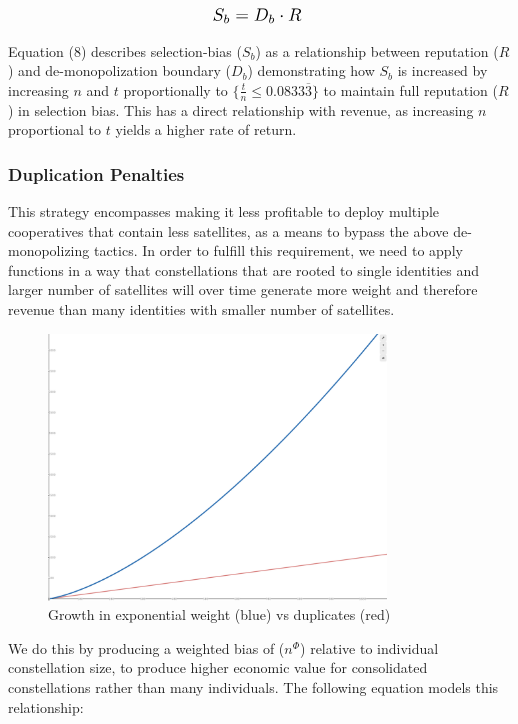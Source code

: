 \documentclass[11pt]{article}
\begin{document}
\begin{equation}
    \resizebox{.20\hsize}{!}{$S_b = D_b \cdot R$ }
\end{equation}

\bigskip
\noindent Equation (8) describes selection-bias ($S_b$) as a relationship between reputation ($R$) and de-monopolization boundary ($D_b$) demonstrating how $S_b$ is increased by increasing $n$ and $t$ proportionally to $\{\frac{t}{n} \leq 0.0833\overline{3}\}$ to maintain full reputation ($R$) in selection bias.
This has a direct relationship with revenue, as increasing $n$ proportional to $t$ yields a higher rate of return.


\subsubsection{Duplication Penalties}

\noindent This strategy encompasses making it less profitable to deploy multiple cooperatives that contain less satellites, as a means to bypass the above de-monopolizing tactics. 
In order to fulfill this requirement, we need to apply functions in a way that constellations that are rooted to single identities and larger number of satellites will over time generate more weight and therefore revenue than many identities with smaller number of satellites.

\begin{figure}[h]
    \centering
    \includegraphics[width=0.80\textwidth]{./images/rsz_duplication.png}
    \caption{Growth in exponential weight (blue) vs duplicates (red)}
\end{figure}

\smallskip
\noindent We do this by producing a weighted bias of ($n^{\Phi}$) relative to individual constellation size, to produce higher economic value for consolidated constellations rather than many individuals.
The following equation models this relationship:
\end{document}
